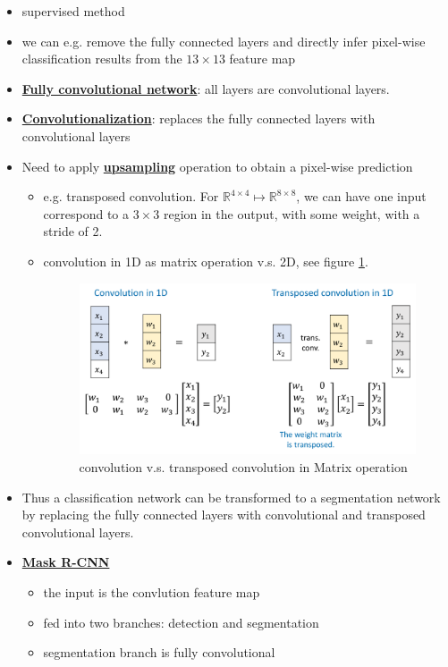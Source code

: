 \documentclass[twocolumn,landscape,10pt]{article}
\theoremstyle{definition}
\begin{document}
\begin{itemize}
    \item supervised method
    \item we can e.g. remove the fully connected layers and
        directly infer pixel-wise classification results 
        from the $13\times 13$ feature map
    \item \underline{\textbf{Fully convolutional network}}: all layers are
        convolutional layers.
    \item \underline{\textbf{Convolutionalization}}: replaces the fully
        connected layers with convolutional layers
    \item Need to apply \underline{\textbf{upsampling}} operation to obtain a
        pixel-wise prediction
        \begin{itemize}
            \item e.g. transposed convolution. 
                For $\mathbb{R}^{4\times 4}\mapsto\mathbb{R}^{8\times 8}$,
                we can have one input correspond to a $3\times 3$ region in the
                output, with some weight, with a stride of 2.
            \item convolution in 1D as matrix operation v.s. 2D, see figure
                \ref{fig:conv1d}.
                \begin{figure}[h]
                  	\includegraphics[scale=0.29]{1d-convolution.png}
                  	\centering
                  	\caption{convolution v.s. transposed convolution in Matrix
                    operation}\label{fig:conv1d}
                \end{figure}
                
        \end{itemize} 
    \item Thus a classification network can be transformed to a segmentation
        network by replacing the fully connected layers with convolutional and
        transposed convolutional layers.
    \item \underline{\textbf{Mask R-CNN}}
        \begin{itemize}
            \item the input is the convlution feature map
            \item fed into two branches: detection and segmentation
            \item segmentation branch is fully convolutional
        \end{itemize} 
\end{itemize} 
\end{document}
